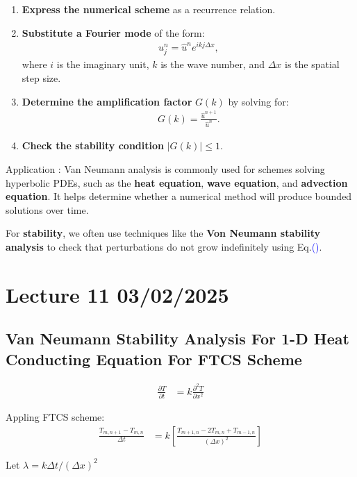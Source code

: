 \documentclass[fleqn,10pt]{SelfArx} %
\newcommand{\myeqref}[1]{Eq.\textcolor{blue}{\textup{(\getrefnumber{#1})}}}
\begin{document}
\begin{enumerate}[noitemsep]
    \item \textbf{Express the numerical scheme} as a recurrence relation.
    \item \textbf{Substitute a Fourier mode} of the form:
    \begin{align*}
        u^n_j = \hat{u}^n e^{i k j \Delta x},
    \end{align*}
    where \( i \) is the imaginary unit, \( k \) is the wave number, and \( \Delta x \) is the spatial step size.
    \item \textbf{Determine the amplification factor} \( G(k) \) by solving for:
    \begin{align*}
        G(k) = \frac{\hat{u}^{n+1}}{\hat{u}^n}.
    \end{align*}
    \item \textbf{Check the stability condition} \( |G(k)| \leq 1 \).
\end{enumerate}

Application : Van Neumann analysis is commonly used for schemes solving hyperbolic PDEs, such as the \textbf{heat equation}, \textbf{wave equation}, and \textbf{advection equation}. It helps determine whether a numerical method will produce bounded solutions over time.

For \textbf{stability}, we often use techniques like the \textbf{Von Neumann stability analysis} to check that perturbations do not grow indefinitely using \myeqref{eq:vanneumann}.

\clearpage
\section{Lecture 11 03/02/2025}
\subsection{Van Neumann Stability Analysis For 1-D Heat Conducting Equation For FTCS Scheme}
\begin{align*}
	\frac{\partial T}{\partial t} &= k\frac{\partial^2 T}{\partial x^2} \tag{11.1} \label{eq:1dheateq}
\end{align*}

Appling FTCS scheme:
\begin{align*}
	\frac{T_{m,n+1} - T_{m,n}}{\Delta t} &= k\left[\frac{T_{m+1,n}-2T_{m,n}+T_{m-1,n}}{(\Delta x)^2}\right] \tag{11.2} \label{eq:1dheatftcseq}
\end{align*}

Let $\lambda = k \Delta t / (\Delta x)^2$
\end{document}
